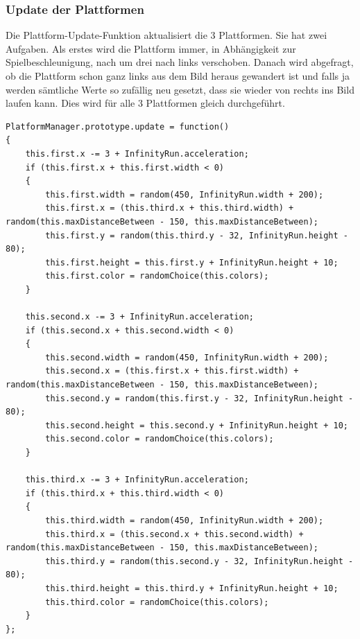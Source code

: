 \subsubsection{Update der Plattformen}
Die Plattform-Update-Funktion aktualisiert die 3 Plattformen. Sie hat zwei Aufgaben. Als erstes wird die Plattform immer, in Abhängigkeit zur Spielbeschleunigung, nach um drei nach links verschoben. Danach wird abgefragt, ob die Plattform schon ganz links aus dem Bild heraus gewandert ist und falls ja werden sämtliche Werte so zufällig neu gesetzt, dass sie wieder von rechts ins Bild laufen kann. Dies wird für alle 3 Plattformen gleich durchgeführt.
\lstset{language=java}
\begin{lstlisting}[frame=single]
PlatformManager.prototype.update = function() 
{
	this.first.x -= 3 + InfinityRun.acceleration;
	if (this.first.x + this.first.width < 0) 
	{
		this.first.width = random(450, InfinityRun.width + 200);
		this.first.x = (this.third.x + this.third.width) + random(this.maxDistanceBetween - 150, this.maxDistanceBetween);
		this.first.y = random(this.third.y - 32, InfinityRun.height - 80);
		this.first.height = this.first.y + InfinityRun.height + 10;
		this.first.color = randomChoice(this.colors);
	}

	this.second.x -= 3 + InfinityRun.acceleration;
	if (this.second.x + this.second.width < 0) 
	{
		this.second.width = random(450, InfinityRun.width + 200);
		this.second.x = (this.first.x + this.first.width) + random(this.maxDistanceBetween - 150, this.maxDistanceBetween);
		this.second.y = random(this.first.y - 32, InfinityRun.height - 80);
		this.second.height = this.second.y + InfinityRun.height + 10;
		this.second.color = randomChoice(this.colors);
	}

	this.third.x -= 3 + InfinityRun.acceleration;
	if (this.third.x + this.third.width < 0) 
	{
		this.third.width = random(450, InfinityRun.width + 200);
		this.third.x = (this.second.x + this.second.width) + random(this.maxDistanceBetween - 150, this.maxDistanceBetween);
		this.third.y = random(this.second.y - 32, InfinityRun.height - 80);
		this.third.height = this.third.y + InfinityRun.height + 10;
		this.third.color = randomChoice(this.colors);
	}
};
\end{lstlisting}
